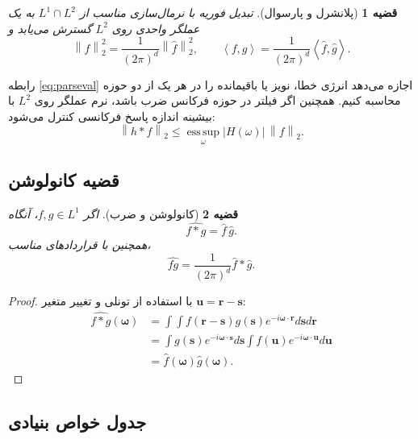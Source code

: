 \documentclass[12pt,openany,oneside]{book}
\newtheorem{theorem}{قضیه}[chapter]
\newcommand{\norm}[1]{\left\lVert #1\right\rVert}
\newcommand{\inner}[2]{\left\langle #1,#2\right\rangle}
\newcommand{\vect}[1]{\bm{#1}}
\newcommand{\esssup}{\operatorname*{ess\,sup}}
\begin{document}
\begin{theorem}[پلانشرل و پارسوال]
تبدیل فوریه با نرمال‌سازی مناسب از \(L^1\cap L^2\) به یک عملگر واحدی روی \(L^2\) گسترش می‌یابد و
\begin{equation}
\norm{f}_2^2=\frac{1}{(2\pi)^d}\norm{\widehat f}_2^2,
\qquad
\inner{f}{g}=\frac{1}{(2\pi)^d}\inner{\widehat f}{\widehat g}.
\label{eq:parseval}
\end{equation}
\end{theorem}

\begin{proofbox}
رابطه \eqref{eq:parseval} اجازه می‌دهد انرژی خطا، نویز یا باقیمانده را در هر یک از دو حوزه محاسبه کنیم.
همچنین اگر فیلتر در حوزه فرکانس ضرب باشد، نرم عملگر روی \(L^2\) با بیشینه اندازه پاسخ فرکانسی کنترل می‌شود:
\begin{equation}
\norm{h*f}_2\le \esssup_{\omega}|H(\omega)|\,\norm f_2.
\end{equation}
\end{proofbox}

\subsection{قضیه کانولوشن}

\begin{theorem}[کانولوشن و ضرب]
اگر \(f,g\in L^1\)، آنگاه
\begin{equation}
\widehat{f*g}=\widehat f\,\widehat g.
\label{eq:conv-theorem}
\end{equation}
همچنین با قراردادهای مناسب،
\begin{equation}
\widehat{fg}=\frac{1}{(2\pi)^d}\widehat f*\widehat g.
\end{equation}
\end{theorem}

\begin{proof}
با استفاده از تونلی و تغییر متغیر \(\vect u=\vect r-\vect s\):
\begin{align}
\widehat{f*g}(\vect\omega)
&=\int\int f(\vect r-\vect s)g(\vect s)e^{-i\vect\omega\cdot\vect r}
 d\vect s d\vect r\\
&=\int g(\vect s)e^{-i\vect\omega\cdot\vect s}d\vect s
\int f(\vect u)e^{-i\vect\omega\cdot\vect u}d\vect u\\
&=\widehat f(\vect\omega)\widehat g(\vect\omega).
\end{align}
\end{proof}

\subsection{جدول خواص بنیادی}
\end{document}
